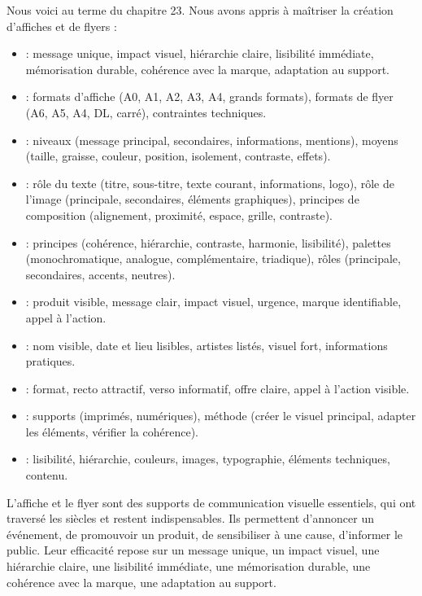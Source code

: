 Nous voici au terme du chapitre 23. Nous avons appris à maîtriser la création d'affiches et de flyers :

\begin{itemize}
    \item {} : message unique, impact visuel, hiérarchie claire, lisibilité immédiate, mémorisation durable, cohérence avec la marque, adaptation au support.
    \item {} : formats d'affiche (A0, A1, A2, A3, A4, grands formats), formats de flyer (A6, A5, A4, DL, carré), contraintes techniques.
    \item {} : niveaux (message principal, secondaires, informations, mentions), moyens (taille, graisse, couleur, position, isolement, contraste, effets).
    \item {} : rôle du texte (titre, sous-titre, texte courant, informations, logo), rôle de l'image (principale, secondaires, éléments graphiques), principes de composition (alignement, proximité, espace, grille, contraste).
    \item {} : principes (cohérence, hiérarchie, contraste, harmonie, lisibilité), palettes (monochromatique, analogue, complémentaire, triadique), rôles (principale, secondaires, accents, neutres).
    \item {} : produit visible, message clair, impact visuel, urgence, marque identifiable, appel à l'action.
    \item {} : nom visible, date et lieu lisibles, artistes listés, visuel fort, informations pratiques.
    \item {} : format, recto attractif, verso informatif, offre claire, appel à l'action visible.
    \item {} : supports (imprimés, numériques), méthode (créer le visuel principal, adapter les éléments, vérifier la cohérence).
    \item {} : lisibilité, hiérarchie, couleurs, images, typographie, éléments techniques, contenu.
\end{itemize}

L'affiche et le flyer sont des supports de communication visuelle essentiels, qui ont traversé les siècles et restent indispensables. Ils permettent d'annoncer un événement, de promouvoir un produit, de sensibiliser à une cause, d'informer le public. Leur efficacité repose sur un message unique, un impact visuel, une hiérarchie claire, une lisibilité immédiate, une mémorisation durable, une cohérence avec la marque, une adaptation au support.

